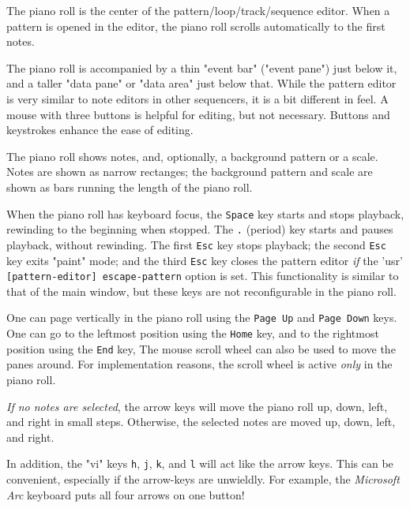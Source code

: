    The piano roll is the center of the pattern/loop/track/sequence editor.
   When a pattern is opened in the editor, the piano roll scrolls
   automatically to the first notes.

   The piano roll is accompanied by a thin "event bar"
   ("event pane") just below it,
   and a taller "data pane" or "data area" just below that.
   While the pattern editor is very similar to note editors in other
   sequencers, it is a bit different in feel.  A mouse with three
   buttons is helpful for editing, but not necessary.
   Buttons and keystrokes enhance the ease of editing.

   The piano roll shows notes, and, optionally, a background pattern or a
   scale.  Notes are shown as narrow rectanges; the background
   pattern and scale are shown as bars running the length of the piano roll.

   When the piano roll has keyboard focus, the \texttt{Space} key
   starts and stops playback, rewinding to the beginning when stopped.
   The \texttt{.} (period) key starts and pauses playback, without
   rewinding.
   The first \texttt{Esc} key stops playback;
   the second \texttt{Esc} key exits "paint" mode; and
   the third \texttt{Esc} key closes the pattern editor \textsl{if}
   the 'usr' \texttt{[pattern-editor] escape-pattern} option is set.
   This functionality is similar to that of the main window, but
   these keys are not reconfigurable in the piano roll.

   One can page vertically in the piano roll using the
    \texttt{Page Up} and 
    \texttt{Page Down} keys.
   One can go to the leftmost position using the 
    \texttt{Home} key,
   and to the rightmost position using the
    \texttt{End} key,
   The mouse scroll wheel can also be used to move the panes around.
   For implementation reasons, the scroll wheel is active
   \textsl{only} in the piano roll.

   \textsl{If no notes are selected}, the arrow keys will move the piano roll
   up, down, left, and right in small steps.
   Otherwise, the selected notes are moved
   up, down, left, and right.

   In addition, the "vi" keys \texttt{h}, \texttt{j}, \texttt{k}, and
   \texttt{l} will act like the arrow keys. This can be convenient, especially
   if the arrow-keys are unwieldly.  For example, the
   \textsl{Microsoft Arc} keyboard puts all four arrows on one button!

